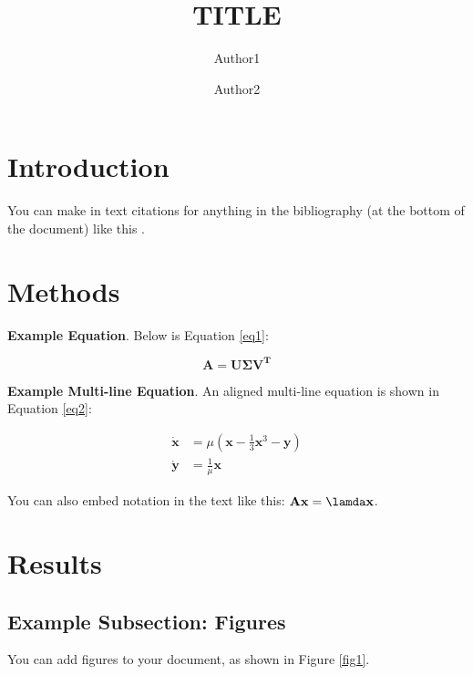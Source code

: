 \documentclass[runningheads]{llncs}
\begin{document}
\title{TITLE}

\author{Author1 \and
Author2}


\maketitle   



\section{Introduction}
You can make in text citations for anything in the bibliography (at the bottom of the document) like this \cite{Turing}. 


\section{Methods}


\textbf{Example Equation}. Below is Equation \ref{eq1}:

\begin{equation}\label{eq1}
    \mathbf{A} = \mathbf{U \Sigma V^{\text{T}}}
\end{equation}

\noindent \textbf{Example Multi-line Equation}. An aligned multi-line equation is shown in Equation \ref{eq2}:

\begin{align}\label{eq2}
    \mathbf{\dot{x}} &= \mu (\mathbf{x} - \frac{1}{3}\mathbf{x}^3 - \mathbf{y} ) \\
    \mathbf{\dot{y}} &= \frac{1}{\mu} \mathbf{x} 
\end{align}

\noindent You can also embed notation in the text like this: $\mathbf{Ax} = \lamda \mathbf{x}$.

\clearpage %
\section{Results}

\subsection{Example Subsection: Figures}
You can add figures to your document, as shown in Figure \ref{fig1}.
\end{document}
